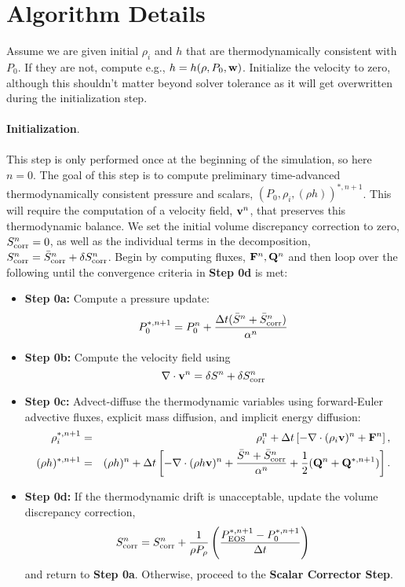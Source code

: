 \documentclass[final]{siamltex}
\def\Fb {{\bf F}}
\def\Qb {{\bf Q}}
\def\vb {{\bf v}}
\def\wb {{\bf w}}
\begin{document}
\section{Algorithm Details}
Assume we are given initial $\rho_i$ and $h$ that are thermodynamically consistent with 
$P_0$.  If they are not, compute e.g., $h = h(\rho,P_0,\wb)$.  Initialize the velocity
to zero, although this shouldn't matter beyond solver tolerance as it will get 
overwritten during the initialization step.\\ \\
{\bf Initialization}.\\ \\
This step is only performed once at the beginning of the simulation, so here $n=0$.
The goal of this step is to compute preliminary time-advanced thermodynamically
consistent pressure and scalars, $(P_0,\rho_i,(\rho h))^{*,n+1}$.  This will
require the computation of a velocity field, $\vb^n$, that preserves this
thermodynamic balance.  
We set the initial volume discrepancy correction to zero, 
$S_{\rm corr}^n = 0$, as well as the individual terms in the decomposition,
$S_{\rm corr}^n = \bar{S}_{\rm corr}^n + \delta S_{\rm corr}^n$.
Begin by computing fluxes, $\Fb^n, \Qb^n$ and then
loop over the following until the convergence criteria in {\bf Step 0d} is met:\\
\begin{itemize}
\item {\bf Step 0a:} Compute a pressure update:
\begin{equation}
P_0^{*,n+1} = P_0^n + \frac{\Delta t(\bar{S}^n + \bar{S}_{\rm corr}^n)}{\alpha^n}
\end{equation}
\item {\bf Step 0b:} Compute the velocity field using
\begin{equation}
\nabla\cdot\vb^n = \delta S^n + \delta S_{\rm corr}^n
\end{equation}
\item {\bf Step 0c:} Advect-diffuse the thermodynamic variables using forward-Euler advective fluxes,
explicit mass diffusion, and implicit energy diffusion:
\begin{eqnarray}
\rho_i^{*,n+1} &=& \rho_i^n + \Delta t\left[-\nabla\cdot(\rho_i\vb)^n + \Fb^n\right], \\
(\rho h)^{*,n+1} &=& (\rho h)^n + \Delta t\left[-\nabla\cdot(\rho h\vb)^n + \frac{\bar{S}^n + \bar{S}_{\rm corr}^n}{\alpha^n} + \frac{1}{2}(\Qb^n + \Qb^{*,n+1})\right].\nonumber\\
\end{eqnarray}
\item {\bf Step 0d:} If the thermodynamic drift is unacceptable, update the volume 
discrepancy correction,
\begin{equation}
S_{\rm corr}^n = S_{\rm corr}^n + \frac{1}{\rho P_\rho}\left(\frac{P_{\rm EOS}^{*,n+1} - P_0^{*,n+1}}{\Delta t}\right)
\end{equation}
and return to {\bf Step 0a}.  Otherwise, proceed to the {\bf Scalar Corrector Step}.\\
\end{itemize}
\end{document}
